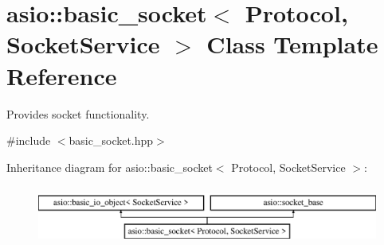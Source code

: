 \hypertarget{classasio_1_1basic__socket}{}\section{asio\+:\+:basic\+\_\+socket$<$ Protocol, Socket\+Service $>$ Class Template Reference}
\label{classasio_1_1basic__socket}


Provides socket functionality.  




{\ttfamily \#include $<$basic\+\_\+socket.\+hpp$>$}

Inheritance diagram for asio\+:\+:basic\+\_\+socket$<$ Protocol, Socket\+Service $>$\+:\begin{figure}[H]
\begin{center}
\leavevmode
\includegraphics[height=1.971831cm]{classasio_1_1basic__socket}
\end{center}
\end{figure}
